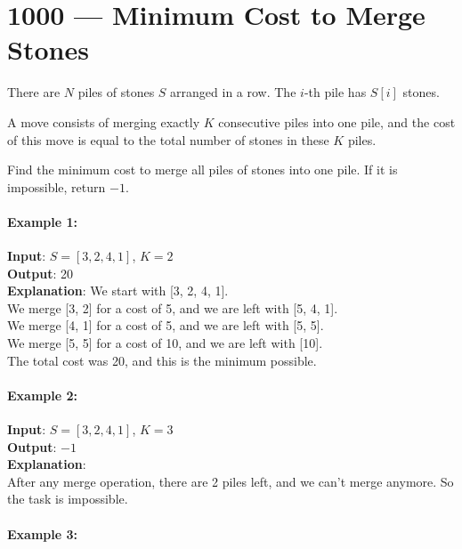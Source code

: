 \section{1000 --- Minimum Cost to Merge Stones}
There are $N$ piles of stones $S$ arranged in a row. The $i$-th pile has $S[i]$ stones.
\par
A move consists of merging exactly $K$ consecutive piles into one pile, and the cost of this move is equal to the total number of stones in these $K$ piles.
\par
Find the minimum cost to merge all piles of stones into one pile.  If it is impossible, return $-1$.

 

\paragraph{Example 1:}

\begin{flushleft}
\textbf{Input}: $S = [3,2,4,1]$, $K = 2$
\\
\textbf{Output}: 20
\\
\textbf{Explanation}: 
We start with [3, 2, 4, 1].
\\
We merge [3, 2] for a cost of 5, and we are left with [5, 4, 1].
\\
We merge [4, 1] for a cost of 5, and we are left with [5, 5].
\\
We merge [5, 5] for a cost of 10, and we are left with [10].
\\
The total cost was 20, and this is the minimum possible.
\end{flushleft}

\paragraph{Example 2:}

\begin{flushleft}
\textbf{Input}: $S = [3,2,4,1]$, $K = 3$
\\
\textbf{Output}: $-1$
\\
\textbf{Explanation}:
\\
After any merge operation, there are 2 piles left, and we can't merge anymore.  So the task is impossible.
\end{flushleft}

\paragraph{Example 3:}

